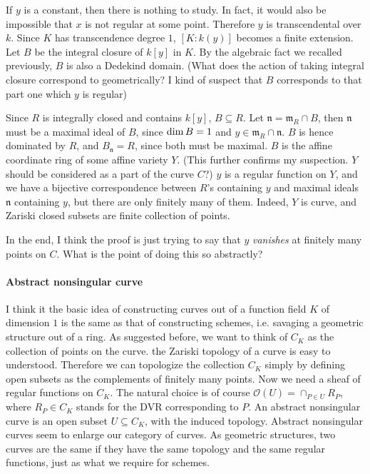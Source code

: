 \documentclass[12pt]{article}
\theoremstyle{plain}
\theoremstyle{definition}
\theoremstyle{named}
\newcommand{\fm}{\mathfrak{m}}
\newcommand{\fn}{\mathfrak{n}}
\newcommand{\sO}{\mathcal{O}}
\renewcommand\dim{{\rm dim\,}}
\newcommand{\<}{\langle}
\renewcommand{\>}{\rangle}
\begin{document}
If $y$ is a constant, then there is nothing to study. In fact, it would also be impossible that $x$ is not regular at some point. Therefore $y$ is transcendental over $k$. Since $K$ has transcendence degree $1$, $[K : k(y)]$ becomes a finite extension. Let $B$ be the integral closure of $k[y]$ in $K$. By the algebraic fact we recalled previously, $B$ is also a Dedekind domain. (What does the action of taking integral closure correspond to geometrically? I kind of suspect that $B$ corresponds to that part one which $y$ is regular)

Since $R$ is integrally closed and contains $k[y]$, $B \subseteq R$. Let $\fn = \fm_R \cap B$, then $\fn$ must be a maximal ideal of $B$, since $\dim B = 1$ and $y \in \fm_R \cap \fn$. $B$ is hence dominated by $R$, and $B_\fn = R$, since both must be maximal. $B$ is the affine coordinate ring of some affine variety $Y$. (This further confirms my suspection. $Y$ should be considered as a part of the curve $C$?) $y$ is a regular function on $Y$, and we have a bijective correspondence between $R$'s containing $y$ and maximal ideals $\fn$ containing $y$, but there are only finitely many of them. Indeed, $Y$ is curve, and Zariski closed subsets are finite collection of points. 

In the end, I think the proof is just trying to say that $y$ \textit{vanishes} at finitely many points on $C$. What is the point of doing this so abstractly?

\paragraph{Abstract nonsingular curve}  I think it the basic idea of constructing curves out of a function field $K$ of dimension $1$ is the same as that of constructing schemes, i.e. savaging a geometric structure out of a ring. As suggested before, we want to think of $C_K$ as the collection of points on the curve. the Zariski topology of a curve is easy to understood. Therefore we can topologize the collection $C_K$ simply by defining open subsets as the complements of finitely many points. Now we need a sheaf of regular functions on $C_K$. The natural choice is of course $\sO(U) = \cap_{P \in U} R_P$, where $R_P \in C_K$ stands for the DVR corresponding to $P$. An abstract nonsingular curve is an open subset $U \subseteq C_K$, with the induced topology. Abstract nonsingular curves seem to enlarge our category of curves. As geometric structures, two curves are the same if they have the same topology and the same regular functions, just as what we require for schemes. 
\end{document}
